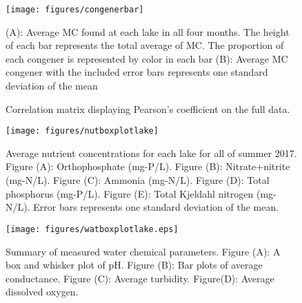 \begin{figure}[!h]
 \texttt{[image: figures/congenerbar]}
 \caption{
 (A): Average MC found at each lake in all four months. The height of each bar represents the total average of MC. The proportion of each congener is represented by color in each bar  
(B): Average MC congener with the included error bars represents one standard deviation of the mean}
 \label{fig:congenerbar}
\end{figure}



\begin{figure}[!ht]
\vspace*{-15mm}
\vspace*{-15mm}
\caption{Correlation matrix displaying Pearson's coefficient on the full data.}
\label{fig:matrixfull}
\end{figure}


\begin{figure}[!hp]
\centering
\texttt{[image: figures/nutboxplotlake]}
\caption{Average nutrient concentrations for each lake for all of summer 2017. Figure (A): Orthophosphate (mg-P/L). Figure (B): Nitrate+nitrite (mg-N/L). Figure (C): Ammonia (mg-N/L). Figure (D): Total phosphorus (mg-P/L). Figure (E): Total Kjeldahl nitrogen (mg-N/L). Error bars represents one standard deviation of the mean. }
\label{fig:nutrients}
\end{figure}


\begin{figure}[!hp]
\centering
\texttt{[image: figures/watboxplotlake.eps]}
\caption{Summary of measured water chemical parameters. Figure (A): A box and whisker plot of pH. Figure (B): Bar plots of average conductance. Figure (C): Average turbidity. Figure(D): Average dissolved oxygen. }
  \end{figure}
